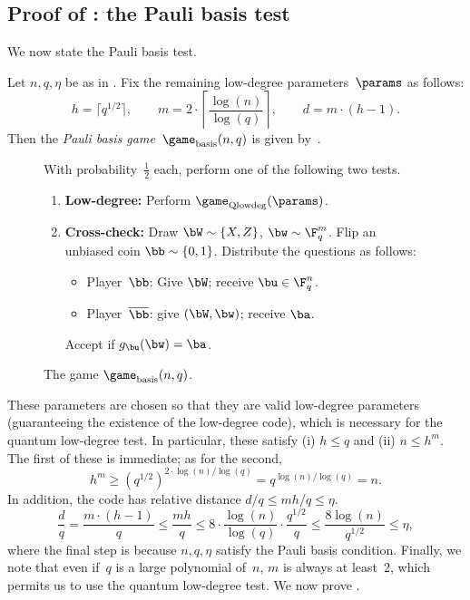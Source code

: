 \subsection{Proof of : the Pauli basis test}

We now state the Pauli basis test.

\begin{definition}
Let $n,q,\eta$ be as in .
Fix the remaining low-degree parameters~$\params$ as follows:
\begin{equation*}
h = \lceil q^{1/2}\rceil, \qquad m = 2\cdot \left\lceil \frac{\log(n)}{\log(q)}\right\rceil,
\qquad d = m \cdot (h-1).
\end{equation*}
Then the \emph{Pauli basis game}~$\game_{\mathrm{basis}}(n,q)$ is given by~.
\end{definition}

{
\begin{figure}
With probability~$\tfrac{1}{2}$ each, perform one of the following two tests.
\begin{enumerate}
\item \textbf{Low-degree:} Perform $\game_{\mathrm{Qlowdeg}}(\params)$. \label{item:qlowdeg-test}
\item \textbf{Cross-check:}  Draw $\bW \sim \{X, Z\}$, $\bw \sim \F_q^m$. Flip an unbiased coin $\bb \sim \{0, 1\}$.
	Distribute the questions as follows:
	\begin{itemize}
	\item[$\circ$] Player~$\bb$: Give $\bW$; receive $\bu \in \F_q^n$.
	\item[$\circ$] Player~$\overline{\bb}$: give $(\bW,\bw)$; receive $\ba$.
	\end{itemize}
	Accept if $g_{\bu}(\bw) = \ba$.
\end{enumerate} \label{item:check-with-qlowdeg}
\caption{The game $\game_{\mathrm{basis}}(n,q)$.\label{fig:pauli-basis}}
\end{figure}
}

These parameters are chosen so that they are valid low-degree parameters
(guaranteeing the existence of the low-degree code),
which is necessary for the quantum low-degree test.
In particular, these satisfy (i) $h \leq q$ and (ii) $n \leq h^m$.
The first of these is immediate; as for the second,
\begin{equation*}
h^m \geq (q^{1/2})^{2 \cdot \log(n)/\log(q)} = q^{\log(n)/\log(q)} = n.
\end{equation*}
In addition, the code has relative distance $d/q \leq mh/q \leq \eta$.
\begin{equation*}
\frac{d}{q} = \frac{m \cdot(h-1)}{q} \leq \frac{m h}{q} \leq 8\cdot \frac{\log(n)}{\log(q)} \cdot \frac{q^{1/2}}{q} \leq \frac{8 \log(n)}{q^{1/2}} \leq \eta,
\end{equation*}
where the final step is because $n, q, \eta$ satisfy the Pauli basis condition.
Finally, we note that even if~$q$ is a large polynomial of~$n$, $m$ is always at least~$2$, which permits us to use the quantum low-degree test.
We now prove .

